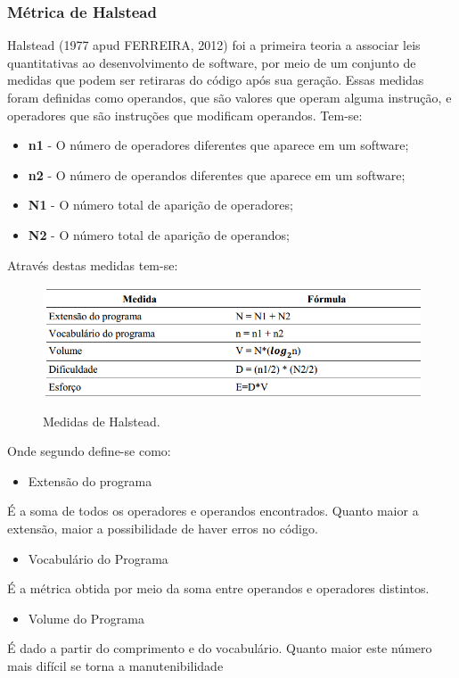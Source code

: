 \subsubsection{Métrica de Halstead}
Halstead (1977 apud FERREIRA, 2012) foi a primeira teoria a associar leis quantitativas ao desenvolvimento de software, por meio de um conjunto de medidas que podem ser retiraras do código após sua geração. Essas medidas foram definidas como operandos, que são valores  que operam alguma instrução, e operadores que são instruções que modificam operandos. Tem-se:
\begin{itemize}
\item \textbf{n1} - O número de operadores diferentes que aparece em um software;
\end{itemize}
\begin{itemize}
\item \textbf{n2} - O número de operandos diferentes que aparece em um software;
\end{itemize}
\begin{itemize}
\item \textbf{N1} - O número total de aparição de operadores;
\end{itemize}
\begin{itemize}
\item \textbf{N2} - O número total de aparição de operandos;
\end{itemize}

Através destas medidas tem-se:
\begin{figure}[h]
\centering
\caption[Medidas de Halstead.]{Medidas de Halstead.}
\includegraphics[width=0.7\linewidth]{./images/volumedehalshead}
\label{fig:Halstead}
\end{figure}

Onde segundo  define-se como:
\begin{itemize}
\item Extensão  do  programa
\end{itemize}
É a soma de todos os operadores e operandos encontrados. Quanto maior a extensão, maior a possibilidade de haver erros no código.
\begin{itemize}
\item Vocabulário do Programa
\end{itemize}
É a métrica obtida por meio da soma entre operandos e operadores distintos. 
\begin{itemize}
\item Volume do Programa
\end{itemize}
É dado a partir do comprimento e do vocabulário. Quanto maior este número mais difícil se torna a manutenibilidade

